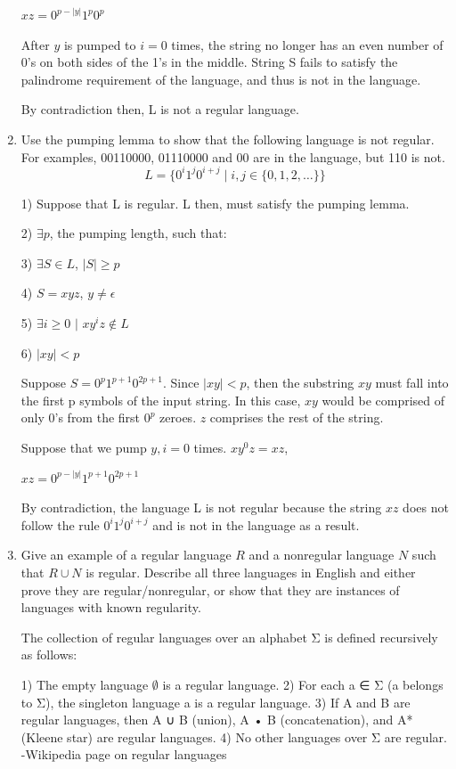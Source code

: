 \documentclass{article}
\begin{document}
\begin{enumerate}
  $xz = 0^{p-|y|}1^p0^p$
  
  After $y$ is pumped to $i = 0$ times, the string no longer has an even number of 0's on both sides of the 1's in the middle.
  String S fails to satisfy the palindrome requirement of the language, and thus is not in the language. 
  
  By contradiction then, L is not a regular language.
  
  

\item Use the pumping lemma to show that the following language is not
  regular.  For examples, 00110000, 01110000 and 00 are in the
  language, but 110 is not.
  \[ L = \{0^i1^j0^{i+j} \mid i,j\in\{0,1,2,\ldots\}\} \]
  
  1) Suppose that L is regular. L then, must satisfy the pumping lemma.
  
  2) $\exists p$, the pumping length, such that:
  
  3) $\exists S \in L$, $|S| \geq p$
  
  4) $S = xyz$, $y \neq \epsilon$
  
  5) $\exists i \geq 0$ $|$ $xy^iz \notin L$
  
  6) $|xy| < p$
  
  Suppose $S = 0^p1^{p+1}0^{2p+1}$. Since $|xy| < p$, then the substring $xy$ must fall into the first p symbols of the input string. In this case, $xy$ would be comprised of only 0's from the first $0^p$ zeroes. $z$ comprises the rest of the string.
  
  Suppose that we pump $y, i = 0$ times. $xy^0z = xz$,
  
  $xz = 0^{p-|y|}1^{p+1}0^{2p+1}$
  
  By contradiction, the language L is not regular because the string $xz$ does not follow the rule $0^i1^j0^{i+j}$ and 
  is not in the language as a result.
  


\item Give an example of a regular language $R$ and a nonregular
  language $N$ such that $R\cup N$ is regular.  Describe all three
  languages in English and either prove they are regular/nonregular,
  or show that they are instances of languages with known regularity.
  
  The collection of regular languages over an alphabet Σ is defined recursively as follows:

	1) The empty language $\emptyset$ is a regular language.
	2) For each a ∈ Σ (a belongs to Σ), the singleton language {a} is a regular language.
	3) If A and B are regular languages, then A ∪ B (union), A • B (concatenation), and A* (Kleene star) are regular languages.
	4) No other languages over Σ are regular.
	-Wikipedia page on regular languages
  

\end{enumerate}
\end{document}
